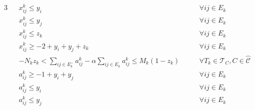 \begin{alignat}{3}
	\label{eq:ecp-v12}
	                                                                 &                    & x _{ij}^{k}                                                        \leq y_i \quad\quad                   & \forall ij \in E_k                        \\
	\label{eq:ecp-v22}
	                                                                 &                    & x _{ij}^{k}                                                        \leq y_j \quad\quad                   & \forall ij \in E_k                        \\
	\label{eq:ecp-t2}
	                                                                 &                    & x _{ij}^{k}                                                        \leq z_k \quad\quad                   & \forall ij \in E_k                        \\
	\label{eq:ecp-e2}
	                                                                 &                    & x _{ij} ^{k}                                                       \geq - 2 + y_i + y_j + z_k \quad\quad & \forall ij \in E_k                        \\
	\label{eq:ecp-a-alpha-constraint}
	                                                                 &                    & -N_k z_k < \sum^{}_{ij \in E^-_k} a_{ij}^{k}  - \alpha \sum^{}_{ij
		\in E_k}
	a_{ij} ^{k}                   \leq M_{k} (1 - z_{k})  \quad\quad & \forall T_{k} \in
	\mathcal{T} _{C}, C \in \mathcal{\hat{C}}                                                                                                                                                                                                    \\
	\label{eq:ecp-a-ij-g-i-j2}
	                                                                 &                    & a_{ij}^{k}                                                         \geq -1 + y_i + y_j \quad\quad        & \forall ij \in E_k                        \\
	\label{eq:ecp-a-ij-l-i2}
	                                                                 &                    & a_{ij}^{k}                                                         \leq y_i\quad\quad                    & \forall ij \in E_k                        \\
	\label{eq:ecp-a-ij-l-j2}
	                                                                 &                    & a_{ij}^{k}                                                         \leq y_j \quad\quad                   & \forall ij \in E_k                        \\

\end{alignat}
